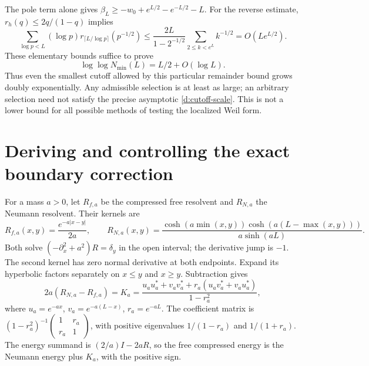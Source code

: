 The pole term alone gives
$\beta_L\ge-w_0+e^{L/2}-e^{-L/2}-L$.
For the reverse estimate, $r_h(q)\le2q/(1-q)$ implies
\[
\sum_{\log p<L}(\log p)r_{\lceil L/\log p\rceil}(p^{-1/2})
\le\frac{2L}{1-2^{-1/2}}\sum_{2\le k<e^L}k^{-1/2}
=O(Le^{L/2}).
\]
These elementary bounds suffice to prove
\begin{equation}\label{d:double-exponential}
\log\log N_{\min}(L)=L/2+O(\log L).
\end{equation}
Thus even the smallest cutoff allowed by this particular remainder bound
grows doubly exponentially. Any admissible selection is at least as large;
an arbitrary selection need not satisfy the precise asymptotic
\eqref{d:cutoff-scale}. This is not a lower bound for all possible methods
of testing the localized Weil form.

\section{Deriving and controlling the exact boundary correction}
For a mass $a>0$, let $R_{f,a}$ be the compressed free resolvent and
$R_{N,a}$ the Neumann resolvent. Their kernels are
\[
R_{f,a}(x,y)=\frac{e^{-a|x-y|}}{2a},\qquad
R_{N,a}(x,y)=\frac{\cosh(a\min(x,y))\cosh(a(L-\max(x,y)))}{a\sinh(aL)}.
\]
Both solve $(-\partial_x^2+a^2)R=\delta_y$ in the open interval;
the derivative jump is $-1$. The second kernel has zero normal derivative
at both endpoints. Expand its hyperbolic factors separately on $x\le y$
and $x\ge y$. Subtraction gives
\begin{equation}\label{d:mass-boundary}
2a(R_{N,a}-R_{f,a})=K_a
=\frac{u_au_a^*+v_av_a^*+r_a(u_av_a^*+v_au_a^*)}{1-r_a^2},
\end{equation}
where $u_a=e^{-ax}$, $v_a=e^{-a(L-x)}$, $r_a=e^{-aL}$.
The coefficient matrix is $(1-r_a^2)^{-1}
\left(\begin{smallmatrix}1&r_a\\r_a&1\end{smallmatrix}\right)$, with
positive eigenvalues $1/(1-r_a)$ and $1/(1+r_a)$.
The energy summand is $(2/a)I-2aR$, so the free compressed energy is
the Neumann energy plus $K_a$, with the positive sign.

